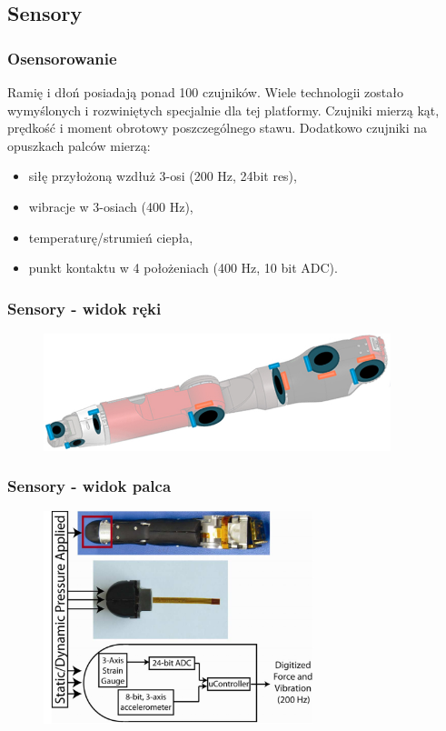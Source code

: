 \documentclass[8pt]{beamer}
\begin{document}
\subsection{Sensory}
\begin{frame}
\frametitle{Osensorowanie}
Ramię i dłoń posiadają ponad 100 czujników. Wiele technologii zostało wymyślonych i rozwiniętych specjalnie dla tej platformy. Czujniki mierzą kąt, prędkość i moment obrotowy poszczególnego stawu.
Dodatkowo czujniki na opuszkach palców mierzą:
\begin{itemize}
\item siłę przyłożoną wzdłuż 3-osi (200 Hz, 24bit res),
\item wibracje w 3-osiach (400 Hz),
\item temperaturę/strumień ciepła,
\item punkt kontaktu w 4 położeniach (400 Hz, 10 bit ADC).
\end{itemize}
\end{frame}
\begin{frame}
\frametitle{Sensory - widok ręki}
\begin{figure}[htbp]
  \begin{center}
    \includegraphics[width=0.9\textwidth]{graphics/arm_s.jpg}
  \end{center}
 \end{figure} 
\end{frame}
\begin{frame}
\frametitle{Sensory - widok palca}
\begin{figure}[htbp]
  \begin{center}
    \includegraphics[width=0.7\textwidth]{graphics/Finger.png}
  \end{center}
 \end{figure} 
\end{frame}
\end{document}
